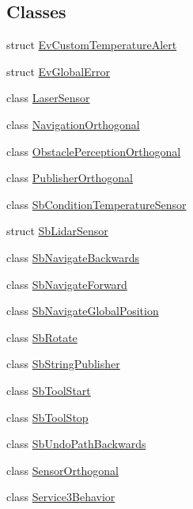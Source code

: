 \subsection*{Classes}
\begin{DoxyCompactItemize}
\item 
struct \hyperlink{structsm__dance__bot_1_1EvCustomTemperatureAlert}{Ev\+Custom\+Temperature\+Alert}
\item 
struct \hyperlink{structsm__dance__bot_1_1EvGlobalError}{Ev\+Global\+Error}
\item 
class \hyperlink{classsm__dance__bot_1_1LaserSensor}{Laser\+Sensor}
\item 
class \hyperlink{classsm__dance__bot_1_1NavigationOrthogonal}{Navigation\+Orthogonal}
\item 
class \hyperlink{classsm__dance__bot_1_1ObstaclePerceptionOrthogonal}{Obstacle\+Perception\+Orthogonal}
\item 
class \hyperlink{classsm__dance__bot_1_1PublisherOrthogonal}{Publisher\+Orthogonal}
\item 
class \hyperlink{classsm__dance__bot_1_1SbConditionTemperatureSensor}{Sb\+Condition\+Temperature\+Sensor}
\item 
struct \hyperlink{structsm__dance__bot_1_1SbLidarSensor}{Sb\+Lidar\+Sensor}
\item 
class \hyperlink{classsm__dance__bot_1_1SbNavigateBackwards}{Sb\+Navigate\+Backwards}
\item 
class \hyperlink{classsm__dance__bot_1_1SbNavigateForward}{Sb\+Navigate\+Forward}
\item 
class \hyperlink{classsm__dance__bot_1_1SbNavigateGlobalPosition}{Sb\+Navigate\+Global\+Position}
\item 
class \hyperlink{classsm__dance__bot_1_1SbRotate}{Sb\+Rotate}
\item 
class \hyperlink{classsm__dance__bot_1_1SbStringPublisher}{Sb\+String\+Publisher}
\item 
class \hyperlink{classsm__dance__bot_1_1SbToolStart}{Sb\+Tool\+Start}
\item 
class \hyperlink{classsm__dance__bot_1_1SbToolStop}{Sb\+Tool\+Stop}
\item 
class \hyperlink{classsm__dance__bot_1_1SbUndoPathBackwards}{Sb\+Undo\+Path\+Backwards}
\item 
class \hyperlink{classsm__dance__bot_1_1SensorOrthogonal}{Sensor\+Orthogonal}
\item 
class \hyperlink{classsm__dance__bot_1_1Service3Behavior}{Service3\+Behavior}
\item 

\end{DoxyCompactItemize}
